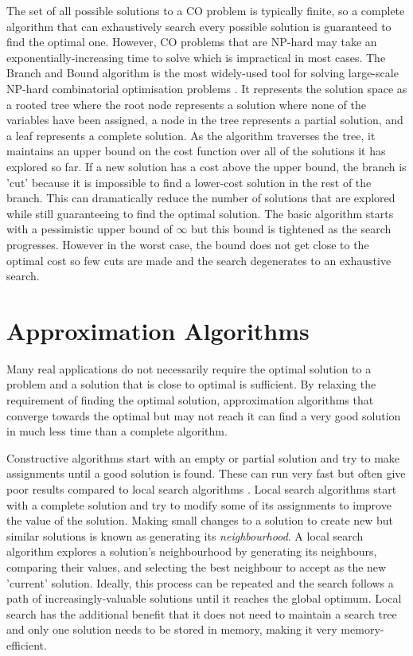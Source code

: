 The set of all possible solutions to a CO problem is typically finite, so a complete algorithm that can exhaustively search every possible solution is guaranteed to find the optimal one. However, CO problems that are NP-hard \citep{garey1979computers} may take an exponentially-increasing time to solve which is impractical in most cases. The Branch and Bound algorithm \citep{land1960automatic} is the most widely-used tool for solving large-scale NP-hard combinatorial optimisation problems \citep{clausen1999branch}. It represents the solution space as a rooted tree where the root node represents a solution where none of the variables have been assigned, a node in the tree represents a partial solution, and a leaf represents a complete solution. As the algorithm traverses the tree, it maintains an upper bound on the cost function over all of the solutions it has explored so far. If a new solution has a cost above the upper bound, the branch is 'cut' because it is impossible to find a lower-cost solution in the rest of the branch. This can dramatically reduce the number of solutions that are explored while still guaranteeing to find the optimal solution. The basic algorithm starts with a pessimistic upper bound of $\infty$ but this bound is tightened as the search progresses. However in the worst case, the bound does not get close to the optimal cost so few cuts are made and the search degenerates to an exhaustive search.

\section{Approximation Algorithms}
Many real applications do not necessarily require the optimal solution to a problem and a solution that is close to optimal is sufficient. By relaxing the requirement of finding the optimal solution, approximation algorithms that converge towards the optimal but may not reach it can find a very good solution in much less time than a complete algorithm.

Constructive algorithms start with an empty or partial solution and try to make assignments until a good solution is found. These can run very fast but often give poor results compared to local search algorithms \citep{blum2003metaheuristics}. Local search algorithms start with a complete solution and try to modify some of its assignments to improve the value of the solution. Making small changes to a solution to create new but similar solutions is known as generating its \emph{neighbourhood}. A local search algorithm explores a solution's neighbourhood by generating its neighbours, comparing their values, and selecting the best neighbour to accept as the new 'current' solution. Ideally, this process can be repeated and the search follows a path of increasingly-valuable solutions until it reaches the global optimum. Local search has the additional benefit that it does not need to maintain a search tree and only one solution needs to be stored in memory, making it very memory-efficient.

